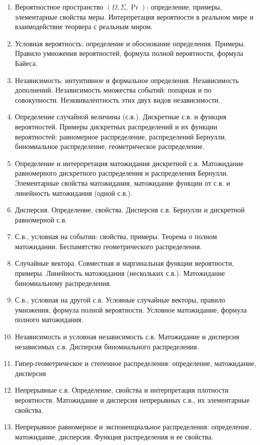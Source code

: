 \documentclass[12pt]{article}
\begin{document}
\begin{enumerate}
  \item Вероятностное пространство $(\Omega, \Sigma, \Pr)$: определение, примеры, элементарные свойства меры. Интерпретация вероятности в реальном мире и взаимодействие теорвера с реальным миром.
  \item Условная вероятность: определение и обоснование определения. Примеры. Правило умножения вероятностей, формула полной вероятности, формула Байеса.
  \item Независимость: интуитивное и формальное определения. Независимость дополнений. Независимость множества событий: попарная и по совокупности. Неэквивалентность этих двух видов независимости.
  \item Определение случайной величины (с.в.). Дискретные с.в. и функция вероятностей. Примеры дискретных распределений и их функции вероятностей: равномерное распределение, распределений Бернулли, биномиальное распределение, геометрическое распределение.
  \item Определение и интерпретация матожидания дискретной с.в. Матожидание равномерного дискретного распределения и распределения Бернулли. Элементарные свойства матожидания, матожидание функции от с.в. и линейность матожидания (одной с.в.).
  \item Дисперсия. Определение, свойства. Дисперсия с.в. Бернулли и дискретной равномерной с.в.
  \item С.в., условная на событии: свойства, примеры. Теорема о полном матожидании. Беспамятство геометрического распределения.
  \item Случайные вектора. Совместная и маргинальная функции вероятности, примеры. Линейность матожидания (нескольких с.в.). Матожидание биномиальному распределения.
  \item С.в., условная на другой с.в. Условные случайные векторы, правило умножения, формула полной вероятности. Условное матожидание, формула полного матожидания.
  \item Независимость и условная независимость с.в. Матожидание и дисперсия независимых с.в. Дисперсия биномиального распределения.
  \item Гипер-геометрическое и степенное распределения: определение, матожидание, дисперсия
  \item Непрерывные с.в. Определение, свойства и интерпретация плотности вероятности. Матожидание и дисперсия непрерывных с.в., их элементарные свойства.
  \item Непрерывное равномерное и экспоненциальное распределения: определение, матожидание, дисперсия. Функция распределения и ее свойства.

\end{enumerate}
\end{document}
